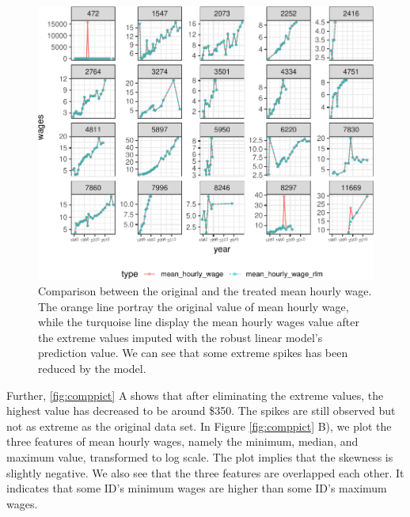 \documentclass{article}
\begin{document}
\begin{figure}

{\centering \includegraphics[width=0.7\linewidth]{figures/compare-plot-1} 

}

\caption{Comparison between the original and the treated mean hourly wage. The orange line portray the original value of mean hourly wage, while the turquoise line display the mean hourly wages value after the extreme values imputed with the robust linear model's prediction value. We can see that some extreme spikes has been reduced by the model.}\label{fig:compare-plot}
\end{figure}

Further, \ref{fig:comppict} A shows that after eliminating the extreme values, the highest value has decreased to be around \$350. The spikes are still observed but not as extreme as the original data set. In Figure \ref{fig:comppict} B), we plot the three features of mean hourly wages, namely the minimum, median, and maximum value, transformed to log scale. The plot implies that the skewness is slightly negative. We also see that the three features are overlapped each other. It indicates that some ID's minimum wages are higher than some ID's maximum wages.
\end{document}
